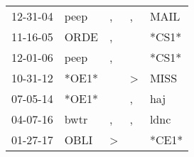 \begin{supertabular}{lllll}
 12-31-04 &   peep &             , &             , &   MAIL \\
 11-16-05 &   ORDE &             , &               &  *CS1* \\
 12-01-06 &   peep &             , &               &  *CS1* \\
 10-31-12 &  *OE1* &               &  \textgreater &   MISS \\
 07-05-14 &  *OE1* &               &             , &    haj \\
 04-07-16 &   bwtr &             , &             , &   ldnc \\
 01-27-17 &   OBLI &  \textgreater &               &  *CE1* \\
\end{supertabular}
